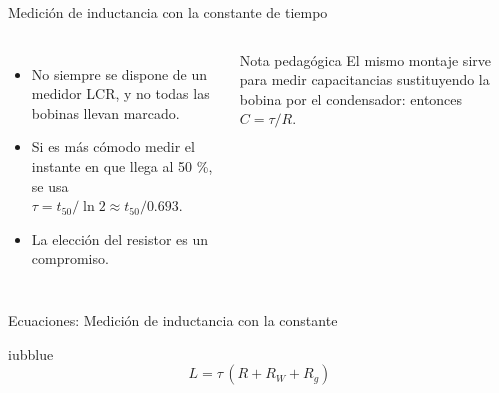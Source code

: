 \documentclass[aspectratio=169,11pt,xcolor={table}]{beamer}
\begin{document}
\begin{frame}{Medición de inductancia con la constante de tiempo}
\begin{columns}[c,onlytextwidth]
\small
\begin{itemize}\setlength{\itemsep}{4pt}
  \item No siempre se dispone de un medidor LCR, y no todas las bobinas llevan marcado.
  \item Si es más cómodo medir el instante en que llega al 50 \%, se usa $\tau = t_{50}/\ln 2 \approx t_{50}/0.693$.
  \item La elección del resistor es un compromiso.
\end{itemize}
\begin{cardO}{Nota pedagógica}
\footnotesize El mismo montaje sirve para medir capacitancias sustituyendo la bobina por el condensador: entonces $C = \tau/R$.
\end{cardO}
\end{columns}
\end{frame}

\begin{frame}{{\normalsize Ecuaciones: Medición de inductancia con la constante}}
\begin{cajaplana}{iubblue}
\centering
{\large
\begin{equation*}
  L = \tau\,(R + R_W + R_g)
\end{equation*}
}
\end{cajaplana}
\end{frame}
\end{document}
